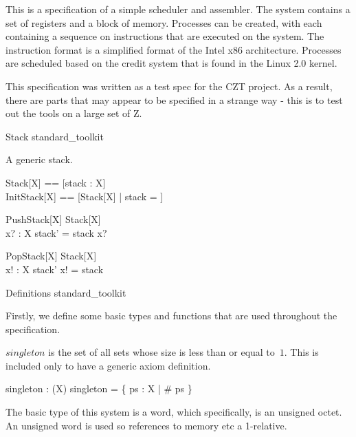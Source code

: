 \documentclass{article}
\begin{document}
This is a specification of a simple scheduler and assembler. The
system contains a set of registers and a block of memory. Processes
can be created, with each containing a sequence on instructions that
are executed on the system. The instruction format is a simplified
format of the Intel x86 architecture. Processes are scheduled based on
the credit system that is found in the Linux 2.0 kernel.

This specification was written as a test spec for the CZT project. As
a result, there are parts that may appear to be specified in a strange
way - this is to test out the tools on a large set of Z.

\begin{zsection}
  \SECTION Stack \parents standard\_toolkit
\end{zsection}

A generic stack.

\begin{zed}
  Stack[X] == [stack : \seq X]\\
  InitStack[X] == [Stack[X] | stack = \emptyset]
\end{zed}

\begin{schema}{PushStack}[X]
  \Delta Stack[X]\\
  x? : X
\where
  stack' = stack \cat \langle x? \rangle
\end{schema}

\begin{schema}{PopStack}[X]
  \Delta Stack[X]\\
  x! : X
\where
  stack' \cat \langle x! \rangle = stack
\end{schema}


\begin{zsection}
  \SECTION Definitions \parents standard\_toolkit
\end{zsection}

Firstly, we define some basic types and functions that are used
throughout the specification.

$singleton$ is the set of all sets whose size is less than or equal to~$1$.
This is included only to have a generic axiom definition.

\begin{gendef}[X]
  singleton : \power (\power X)
\where
  singleton = \{ ps : \power X | \# ps  \}
\end{gendef}

The basic type of this system is a word, which specifically, is an
unsigned octet. An unsigned word is used so references to memory etc a
1-relative.
\end{document}
